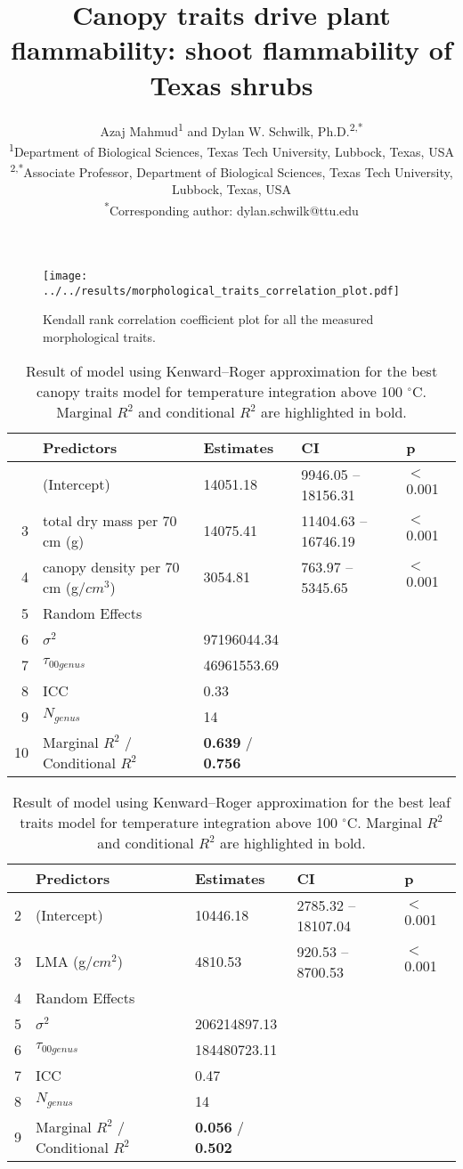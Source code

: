\documentclass[12pt]{report}
\title{Canopy traits drive plant flammability: shoot flammability of Texas shrubs}
\author{Azaj Mahmud\textsuperscript{1} and Dylan W. Schwilk, Ph.D.\textsuperscript{2,*}\\
\textsuperscript{1}Department of Biological Sciences, Texas Tech University, Lubbock, Texas, USA\\
\textsuperscript{2,*}Associate Professor, Department of Biological Sciences, Texas Tech University, Lubbock, Texas, USA\\
\vspace{1em}
\textsuperscript{*}Corresponding author: dylan.schwilk@ttu.edu}
\date{}
\begin{document}
\maketitle


\begin{figure}
\centering
\caption{Kendall rank correlation coefficient plot for all the measured morphological traits.}
\texttt{[image: ../../results/morphological\_traits\_correlation\_plot.pdf]}
\end{figure}

\clearpage

\begin{table}[ht]
\centering
\caption{Result of model using Kenward--Roger approximation for the best canopy traits model for temperature integration above 100 $^{\circ}$C. Marginal $R^2$ and conditional $R^2$ are highlighted in bold.}
\begin{tabular}{rllll}
 \hline
 & Predictors & Estimates & CI & p
 \\ 
  \hline
 & (Intercept) & 14051.18 & 9946.05 – 18156.31 & $<$0.001 \\ 
  3 & total dry mass per 70\,cm (g) & 14075.41 & 11404.63 – 16746.19 & $<$0.001 \\ 
  4 & canopy density per 70\,cm (g/{$cm^3$}) & 3054.81 & 763.97 – 5345.65 & $<$0.001 \\ 
  5 & Random Effects &  &  &  \\ 
  6 & $\sigma^2$ & 97196044.34 &  &  \\ 
  7 & $\tau_{00 genus}$ & 46961553.69 &  &  \\ 
  8 & ICC & 0.33 &  &  \\ 
  9 & $N_{genus}$ & 14 &  &  \\ 
  10 & Marginal $R^2$ / Conditional $R^2$ & \textbf{0.639} / \textbf{0.756} &  &  \\ 
   \hline
\end{tabular}
\end{table}

\begin{table}[ht]
\centering
\caption{Result of model using Kenward--Roger approximation for the best leaf traits model for temperature integration above 100 $^{\circ}$C. Marginal $R^2$ and conditional $R^2$ are highlighted in bold.}
\begin{tabular}{rllll}
  \hline
 & Predictors & Estimates & CI & p \\ 
  \hline
2 & (Intercept) & 10446.18 & 2785.32 – 18107.04 & $<$0.001 \\ 
  3 & LMA (g/{$cm^2$}) & 4810.53 & 920.53 – 8700.53 & $<$0.001 \\ 
  4 & Random Effects &  &  &  \\ 
  5 & $\sigma^2$ & 206214897.13 &  &  \\ 
  6 & $\tau_{00 genus}$ & 184480723.11 &  &  \\ 
  7 & ICC & 0.47 &  &  \\ 
  8 & $N_{genus}$ & 14 &  &  \\ 
  9 & Marginal $R^2$ / Conditional $R^2$ & \textbf{0.056} / \textbf{0.502} &  &  \\ 
   \hline
\end{tabular}
\end{table}
\end{document}
